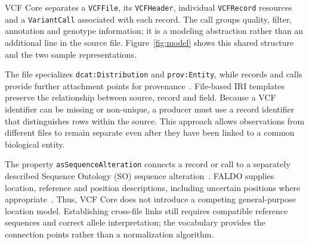 \documentclass{ceurart}
\newcommand{\term}[1]{\texttt{#1}}
\begin{document}
VCF Core separates a \term{VCFFile}, its \term{VCFHeader}, individual \term{VCFRecord} resources and a \term{VariantCall} associated with each record. 
The call groups quality, filter, annotation and genotype information; it is a modeling abstraction rather than an additional line in the source file. 
Figure~\ref{fig:model} shows this shared structure and the two sample representations.

The file specializes \term{dcat:Distribution} and \term{prov:Entity}, while records and calls provide further attachment points for provenance~\cite{prov2013,vcfc210}. 
File-based IRI templates preserve the relationship between source, record and field. 
Because a VCF identifier can be missing or non-unique, a producer must use a record identifier that distinguishes rows within the source. 
This approach allows observations from different files to remain separate even after they have been linked to a common biological entity.

The property \term{asSequenceAlteration} connects a record or call to a separately described Sequence Ontology (SO) sequence alteration~\cite{eilbeck2005so}. 
FALDO supplies location, reference and position descriptions, including uncertain positions where appropriate~\cite{bolleman2016faldo}. 
Thus, VCF Core does not introduce a competing general-purpose location model. 
Establishing cross-file links still requires compatible reference sequences and correct allele interpretation; the vocabulary provides the connection points rather than a normalization algorithm.
\end{document}
